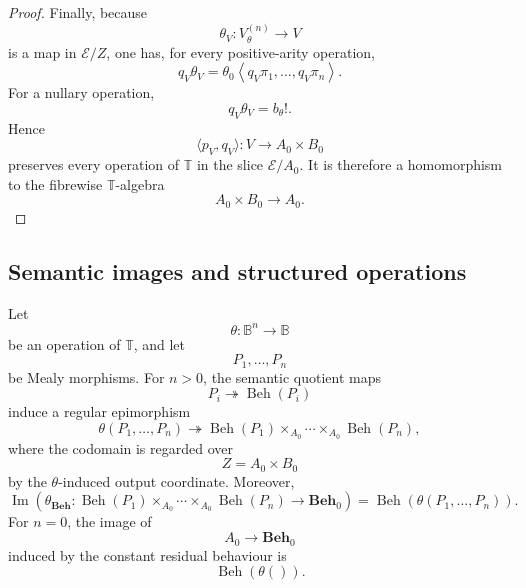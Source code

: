 \begin{proof}
    Finally, because
    \[
        \theta_V:V^{(n)}_\theta\to V
    \]
    is a map in \(\mathcal E/Z\), one has, for every positive-arity
    operation,
    \[
        q_V\theta_V
        =
        \theta_0
        \left\langle
            q_V\pi_1,
            \dots,
            q_V\pi_n
        \right\rangle.
    \]
    For a nullary operation,
    \[
        q_V\theta_V=b_\theta!.
    \]
    Hence
    \[
        \langle p_V,q_V\rangle:
        V\to A_0\times B_0
    \]
    preserves every operation of \(\mathbb T\) in the slice
    \(\mathcal E/A_0\). It is therefore a homomorphism to the fibrewise
    \(\mathbb T\)-algebra
    \[
        A_0\times B_0\to A_0.
    \]
\end{proof}

\subsection{Semantic images and structured operations}
\label{subsec:semantic-images-structured-operations}

\begin{lemma}
\label{lem:semantic-images-structured-operations}
    Let
    \[
        \theta:\mathbb B^n\to\mathbb B
    \]
    be an operation of \(\mathbb T\), and let
    \[
        P_1,\dots,P_n
    \]
    be Mealy morphisms. For \(n>0\), the semantic quotient maps
    \[
        P_i\twoheadrightarrow\operatorname{Beh}(P_i)
    \]
    induce a regular epimorphism
    \[
        \theta(P_1,\dots,P_n)
        \twoheadrightarrow
        \operatorname{Beh}(P_1)\times_{A_0}\cdots\times_{A_0}
        \operatorname{Beh}(P_n),
    \]
    where the codomain is regarded over
    \[
        Z=A_0\times B_0
    \]
    by the \(\theta\)-induced output coordinate. Moreover,
    \[
        \operatorname{Im}
        \left(
        \theta_{\mathbf{Beh}}:
        \operatorname{Beh}(P_1)\times_{A_0}\cdots\times_{A_0}
        \operatorname{Beh}(P_n)
        \to
        \mathbf{Beh}_0
        \right)
        =
        \operatorname{Beh}(\theta(P_1,\dots,P_n)).
    \]
    For \(n=0\), the image of
    \[
        A_0\to\mathbf{Beh}_0
    \]
    induced by the constant residual behaviour is
    \[
        \operatorname{Beh}(\theta()).
    \]
\end{lemma}


